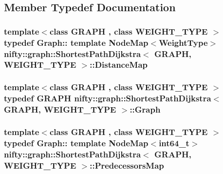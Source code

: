 \subsection{Member Typedef Documentation}
\hypertarget{classnifty_1_1graph_1_1ShortestPathDijkstra_a87e51b119ce8d43b03c913527ff3a4c9}{}
\subsubsection[{Distance\+Map}]{\setlength{\rightskip}{0pt plus 5cm}template$<$class G\+R\+A\+P\+H , class W\+E\+I\+G\+H\+T\+\_\+\+T\+Y\+P\+E $>$ typedef Graph\+:: template Node\+Map$<${\bf Weight\+Type}$>$ {\bf nifty\+::graph\+::\+Shortest\+Path\+Dijkstra}$<$ G\+R\+A\+P\+H, W\+E\+I\+G\+H\+T\+\_\+\+T\+Y\+P\+E $>$\+::{\bf Distance\+Map}}\label{classnifty_1_1graph_1_1ShortestPathDijkstra_a87e51b119ce8d43b03c913527ff3a4c9}
\hypertarget{classnifty_1_1graph_1_1ShortestPathDijkstra_abf7e8e078818d19f973eebe1784f6716}{}
\subsubsection[{Graph}]{\setlength{\rightskip}{0pt plus 5cm}template$<$class G\+R\+A\+P\+H , class W\+E\+I\+G\+H\+T\+\_\+\+T\+Y\+P\+E $>$ typedef G\+R\+A\+P\+H {\bf nifty\+::graph\+::\+Shortest\+Path\+Dijkstra}$<$ G\+R\+A\+P\+H, W\+E\+I\+G\+H\+T\+\_\+\+T\+Y\+P\+E $>$\+::{\bf Graph}}\label{classnifty_1_1graph_1_1ShortestPathDijkstra_abf7e8e078818d19f973eebe1784f6716}
\hypertarget{classnifty_1_1graph_1_1ShortestPathDijkstra_a61f6bc245259c631182b51c3eb34785b}{}
\subsubsection[{Predecessors\+Map}]{\setlength{\rightskip}{0pt plus 5cm}template$<$class G\+R\+A\+P\+H , class W\+E\+I\+G\+H\+T\+\_\+\+T\+Y\+P\+E $>$ typedef Graph\+:: template Node\+Map$<$int64\+\_\+t$>$ {\bf nifty\+::graph\+::\+Shortest\+Path\+Dijkstra}$<$ G\+R\+A\+P\+H, W\+E\+I\+G\+H\+T\+\_\+\+T\+Y\+P\+E $>$\+::{\bf Predecessors\+Map}}\label{classnifty_1_1graph_1_1ShortestPathDijkstra_a61f6bc245259c631182b51c3eb34785b}
\hypertarget{classnifty_1_1graph_1_1ShortestPathDijkstra_a99783a7c717b74f48226852d73844fed}{}
